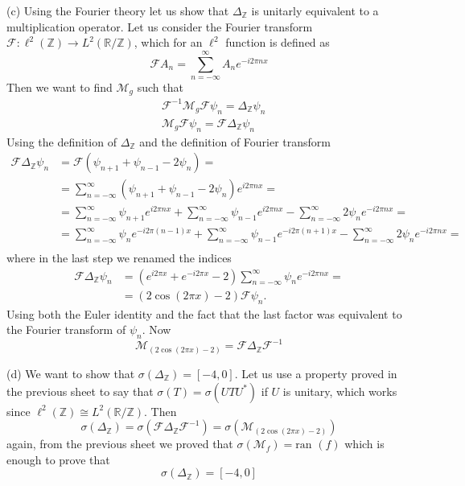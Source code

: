 \documentclass{article}
\newcommand{\R}{\mathbb{R}}
\newcommand{\F}{\mathcal{F}}
\newcommand{\M}{\mathcal{M}}
\newcommand{\f}{\mathcal{F}^{-1}}
\newcommand{\Z}{\mathbb{Z}}
\begin{document}
(c) Using the Fourier theory let us show that $\Delta_\Z$ is unitarly equivalent to a multiplication operator. Let us consider the Fourier transform $\F : \ell^2(\Z) \to L^2 (\R / \Z)$, which for an $\ell^2$ function is defined as 
\[
    \F A_n = \sum_{n = -\infty}^{\infty} A_n e^{-i2\pi n x}
\]
Then we want to find $\mathcal{M}_g$ such that
\[
    \begin{split}
        &\f\M_g \F \psi_n = \Delta_\Z \psi_n\\
        &\M_g \F \psi_n = \F \Delta_\Z \psi_n
    \end{split}
\]
Using the definition of $\Delta_\Z$ and the definition of Fourier transform 
\[
    \begin{split}
        \F \Delta_\Z \psi_n &= \F (\psi_{n+1} + \psi_{n-1} -2 \psi_n) = \\
        &= \sum_{n= -\infty}^\infty (\psi_{n+1} + \psi_{n-1} -2 \psi_n) e^{i2\pi n x} = \\
        & = \sum_{n= -\infty}^\infty \psi_{n+1} e^{i2\pi n x} + \sum_{n= -\infty}^\infty \psi_{n-1} e^{i2\pi n x} - \sum_{n= -\infty}^\infty 2 \psi_n e^{-i2\pi n x} = \\
        & = \sum_{n= -\infty}^\infty \psi_{n} e^{-i2\pi (n -1) x} + \sum_{n= -\infty}^\infty \psi_{n-1} e^{-i2\pi (n+1) x} - \sum_{n= -\infty}^\infty 2 \psi_n e^{- i2\pi n x} =\\ 
    \end{split}
\]
where in the last step we renamed the indices
\[
    \begin{split}
        \F \Delta_\Z \psi_n &= (e^{i2\pi x}+ e^{- i2\pi x} -2 ) \sum_{n= -\infty}^\infty \psi_n e^{-i 2 \pi n x} =\\
        &= (2 \cos{(2\pi x)} -2) \F \psi_n .
    \end{split}
\]
Using both the Euler identity and the fact that the last factor was equivalent to the Fourier transform of $\psi_n$. Now 
\[
    \mathcal M_{(2 \cos{(2\pi x)} -2)} = \F \Delta_\Z \f
\]

(d) We want to show that $\sigma(\Delta_\Z) = [ -4, 0 ]$. Let us use a property proved in the previous sheet to say that $\sigma(T) = \sigma(U T U^*)$ if $U$ is unitary, which works since $\ell^2(\Z) \cong L^2 (\R / \Z)$. Then
\[
    \sigma\left( \Delta_\Z \right) = \sigma\left( \F \Delta_\Z \f \right) = \sigma \left( \mathcal M_{(2 \cos{(2\pi x)} -2)} \right)
\]
again, from the previous sheet we proved that $\sigma(\mathcal M_f) = \mbox{ran }(f)$ which is enough to prove that
\[
    \sigma\left( \Delta_\Z \right) = [-4, 0]
\]
\end{document}
